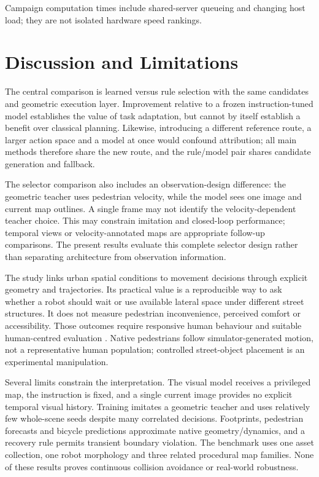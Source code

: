 \documentclass[10pt,a4paper]{article}
\begin{document}
Campaign computation times include shared-server queueing and changing host load; they are not isolated hardware speed rankings.

\section{Discussion and Limitations}
The central comparison is learned versus rule selection with the same candidates and geometric execution layer. Improvement relative to a frozen instruction-tuned model establishes the value of task adaptation, but cannot by itself establish a benefit over classical planning. Likewise, introducing a different reference route, a larger action space and a model at once would confound attribution; all main methods therefore share the new route, and the rule/model pair shares candidate generation and fallback.

The selector comparison also includes an observation-design difference: the geometric teacher uses pedestrian velocity, while the model sees one image and current map outlines. A single frame may not identify the velocity-dependent teacher choice. This may constrain imitation and closed-loop performance; temporal views or velocity-annotated maps are appropriate follow-up comparisons. The present results evaluate this complete selector design rather than separating architecture from observation information.

The study links urban spatial conditions to movement decisions through explicit geometry and trajectories. Its practical value is a reproducible way to ask whether a robot should wait or use available lateral space under different street structures. It does not measure pedestrian inconvenience, perceived comfort or accessibility. Those outcomes require responsive human behaviour and suitable human-centred evaluation \cite{francis}. Native pedestrians follow simulator-generated motion, not a representative human population; controlled street-object placement is an experimental manipulation.

Several limits constrain the interpretation. The visual model receives a privileged map, the instruction is fixed, and a single current image provides no explicit temporal visual history. Training imitates a geometric teacher and uses relatively few whole-scene seeds despite many correlated decisions. Footprints, pedestrian forecasts and bicycle predictions approximate native geometry/dynamics, and a recovery rule permits transient boundary violation. The benchmark uses one asset collection, one robot morphology and three related procedural map families. None of these results proves continuous collision avoidance or real-world robustness.
\end{document}
